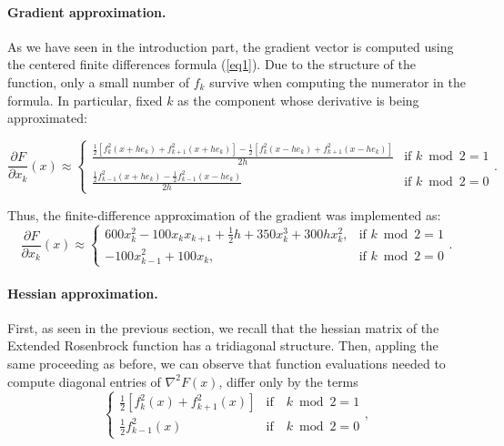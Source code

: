 \documentclass[a4paper,12pt]{article}
\begin{document}
	\paragraph{Gradient approximation.}
	As we have seen in the introduction part, the gradient vector is computed using the centered finite differences formula (\ref{eq1}). Due to the structure of the function, only a small number of $f_{k}$ survive when computing the numerator in the formula. In particular, fixed $k$ as the component whose derivative is being approximated:
	
	\begin{equation}
	\frac{\partial F}{\partial x_{k}}(x) \approx	
	\begin{cases}
	\frac{\frac{1}{2}[f^{2}_{k}(x+he_{k}) + f^{2}_{k+1}(x+he_{k})] - \frac{1}{2}[f^{2}_{k}(x-he_{k}) + f^{2}_{k+1}(x-he_{k})]}{2h} & \text{if } k \bmod 2 = 1 \\
	
	\frac{\frac{1}{2}f^{2}_{k-1}(x+he_{k}) - \frac{1}{2}f^{2}_{k-1}(x-he_{k})}{2h} & \text{if } k \bmod 2 = 0
	
	\end{cases}	
		  .	
	\end{equation}
	
Thus, the finite-difference approximation of the gradient was implemented as:
\[
\frac{\partial F}{\partial x_k}(x) \approx 
\begin{cases}
	600x_k^2 - 100x_k x_{k+1} + \frac{1}{2}h + 350x_k^3 + 300hx_k^2, & \text{if } k \bmod 2 = 1 \\
	-100x_{k-1}^2 + 100x_k, & \text{if } k \bmod 2 = 0
\end{cases}.
\]
	
	\paragraph{Hessian approximation.}
	First, as seen in the previous section, we recall that the hessian matrix of the Extended Rosenbrock function has a tridiagonal structure. Then, appling the same proceeding as before, we can observe that function evaluations needed to compute diagonal entries of $\nabla^{2}F(x)$, differ only by the terms 
	 \[
	 \begin{cases}
	 	\frac{1}{2}[f^{2}_{k}(x) + f^{2}_{k+1}(x)]& \text{if} \quad k \bmod 2 = 1 \\
	 	
	 	\frac{1}{2}f^{2}_{k-1}(x) & \text{if} \quad k \bmod 2 = 0
	 	
	 \end{cases},	
	\]
	
\end{document}
